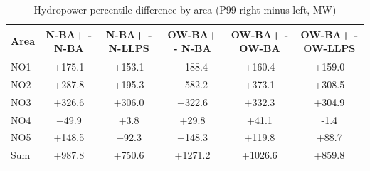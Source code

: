 \begin{table}[htbp]
\centering
\caption{Hydropower percentile difference by area (P99 right minus left, MW)}
\label{tab:hydro_p99_diff_area_pairs}
\begin{tabular}{lccccc}
\hline
Area & N-BA+ - N-BA & N-BA+ - N-LLPS & OW-BA+ - N-BA & OW-BA+ - OW-BA & OW-BA+ - OW-LLPS \\
\hline
NO1 & +175.1 & +153.1 & +188.4 & +160.4 & +159.0 \\
NO2 & +287.8 & +195.3 & +582.2 & +373.1 & +308.5 \\
NO3 & +326.6 & +306.0 & +322.6 & +332.3 & +304.9 \\
NO4 & +49.9 & +3.8 & +29.8 & +41.1 & -1.4 \\
NO5 & +148.5 & +92.3 & +148.3 & +119.8 & +88.7 \\
\hline
Sum & +987.8 & +750.6 & +1271.2 & +1026.6 & +859.8 \\
\hline
\end{tabular}
\end{table}